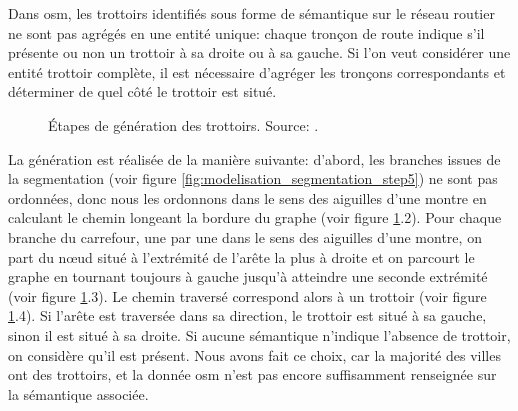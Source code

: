 Dans \gls{osm}, les trottoirs identifiés sous forme de sémantique sur le réseau routier ne sont pas agrégés en une entité unique: chaque tronçon de route indique s'il présente ou non un trottoir à sa droite ou à sa gauche. Si l'on veut considérer une entité trottoir complète, il est nécessaire d'agréger les tronçons correspondants et déterminer de quel côté le trottoir est situé.

\begin{figure}[ht]
    \centering
    \caption[Génération de trottoirs]{Étapes de génération des trottoirs. Source: \citep{Kalsron2022}.}
    \label{fig:modelisation_calcul_pieton_trottoirs}
\end{figure}

La génération est réalisée de la manière suivante: d'abord, les branches issues de la segmentation (voir figure \ref{fig:modelisation_segmentation_step5}) ne sont pas ordonnées, donc nous les ordonnons dans le sens des aiguilles d'une montre en calculant le chemin longeant la bordure du graphe (voir figure \ref{fig:modelisation_calcul_pieton_trottoirs}.2). Pour chaque branche du carrefour, une par une dans le sens des aiguilles d'une montre, on part du nœud situé à l'extrémité de l'arête la plus à droite et on parcourt le graphe en tournant toujours à gauche jusqu'à atteindre une seconde extrémité (voir figure \ref{fig:modelisation_calcul_pieton_trottoirs}.3). Le chemin traversé correspond alors à un trottoir (voir figure \ref{fig:modelisation_calcul_pieton_trottoirs}.4). Si l'arête est traversée dans sa direction, le trottoir est situé à sa gauche, sinon il est situé à sa droite. Si aucune sémantique n'indique l'absence de trottoir, on considère qu'il est présent. Nous avons fait ce choix, car la majorité des villes ont des trottoirs, et la donnée \gls{osm} n'est pas encore suffisamment renseignée sur la sémantique associée.

